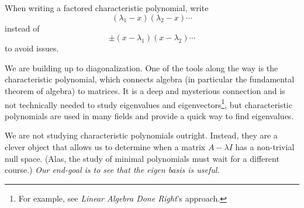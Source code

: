 \documentclass{workbook}
\begin{document}
\begin{lesson}
\begin{annotation}
\begin{notes}
\begin{itemize}
					When writing a factored characteristic polynomial, write
					\[
						(\lambda_1-x)(\lambda_2-x)\cdots
					\]
					instead of
					\[
						\pm(x-\lambda_1)(x-\lambda_2)\cdots
					\]
					to avoid issues.
			\end{itemize}
		\end{notes}
	\end{annotation}
	We are building up to diagonalization. One of the tools along the way is the characteristic polynomial,
	which connects algebra (in particular the fundamental theorem of algebra) to matrices. It is a deep
	and mysterious connection and is not technically needed to study eigenvalues and eigenvectors\footnote{
		For example, see \emph{Linear Algebra Done Right}'s approach.}, but characteristic polynomials
	are used in many fields and provide a quick way to find eigenvalues.

	We are not studying characteristic polynomials outright. Instead, they are a clever object
	that allows us to determine when a matrix $A-\lambda I$ has a non-trivial null space. (Alas, the
	study of minimal polynomials must wait for a different course.)
	\emph{Our end-goal is to see that the eigen basis is useful.}

\end{lesson}
\end{document}
